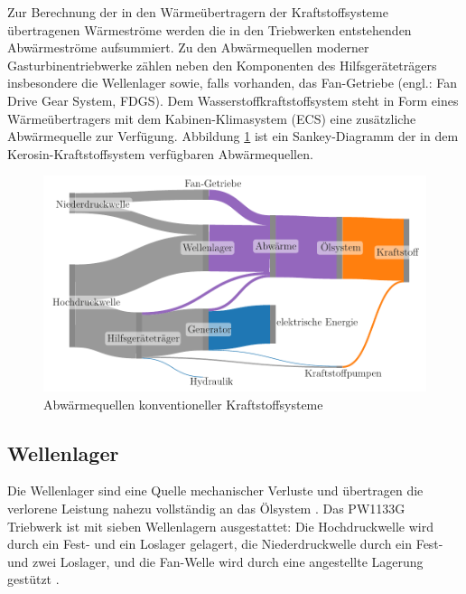 Zur Berechnung der in den Wärmeübertragern der Kraftstoffsysteme übertragenen Wärmeströme werden die in den Triebwerken entstehenden Abwärmeströme aufsummiert. Zu den Abwärmequellen moderner Gasturbinentriebwerke zählen neben den Komponenten des Hilfsgeräteträgers insbesondere die Wellenlager sowie, falls vorhanden, das Fan-Getriebe (engl.: Fan Drive Gear System, FDGS). Dem Wasserstoffkraftstoffsystem steht in Form eines Wärmeübertragers mit dem Kabinen-Klimasystem (ECS) eine zusätzliche Abwärmequelle zur Verfügung. Abbildung \ref{fig:sankey} ist ein Sankey-Diagramm der in dem Kerosin-Kraftstoffsystem verfügbaren Abwärmequellen.

\begin{figure}[ht]
\centering
\includegraphics[width=1\linewidth]{4_Abbildungen/2_Hauptteil/sankey.pdf}
  \caption{Abwärmequellen konventioneller Kraftstoffsysteme}
  \label{fig:sankey}
\end{figure}
\FloatBarrier 

\subsection{Wellenlager}

Die Wellenlager sind eine Quelle mechanischer Verluste und übertragen die verlorene Leistung nahezu vollständig an das Ölsystem \cite{Gloeckner.2017}. Das PW1133G Triebwerk ist mit sieben Wellenlagern ausgestattet: Die Hochdruckwelle wird durch ein Fest- und ein Loslager gelagert, die Niederdruckwelle durch ein Fest- und zwei Loslager, und die Fan-Welle wird durch eine angestellte Lagerung gestützt \cite{AviationKnowledge.2022}. 

